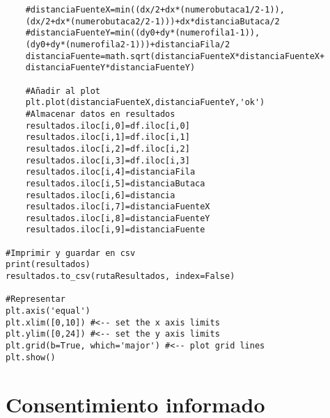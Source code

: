 \documentclass[11pt,a4paper,twoside]{book}
\begin{document}
\begin{verbatim}
    #distanciaFuenteX=min((dx/2+dx*(numerobutaca1/2-1)),
    (dx/2+dx*(numerobutaca2/2-1)))+dx*distanciaButaca/2
    #distanciaFuenteY=min((dy0+dy*(numerofila1-1)),
    (dy0+dy*(numerofila2-1)))+distanciaFila/2
    distanciaFuente=math.sqrt(distanciaFuenteX*distanciaFuenteX+
    distanciaFuenteY*distanciaFuenteY)

    #Añadir al plot
    plt.plot(distanciaFuenteX,distanciaFuenteY,'ok')
    #Almacenar datos en resultados
    resultados.iloc[i,0]=df.iloc[i,0]
    resultados.iloc[i,1]=df.iloc[i,1]
    resultados.iloc[i,2]=df.iloc[i,2]
    resultados.iloc[i,3]=df.iloc[i,3]
    resultados.iloc[i,4]=distanciaFila
    resultados.iloc[i,5]=distanciaButaca
    resultados.iloc[i,6]=distancia
    resultados.iloc[i,7]=distanciaFuenteX
    resultados.iloc[i,8]=distanciaFuenteY
    resultados.iloc[i,9]=distanciaFuente

#Imprimir y guardar en csv
print(resultados)
resultados.to_csv(rutaResultados, index=False)

#Representar
plt.axis('equal')
plt.xlim([0,10]) #<-- set the x axis limits
plt.ylim([0,24]) #<-- set the y axis limits
plt.grid(b=True, which='major') #<-- plot grid lines
plt.show()
\end{verbatim}

\chapter{Consentimiento informado}
    
    
\end{document}
